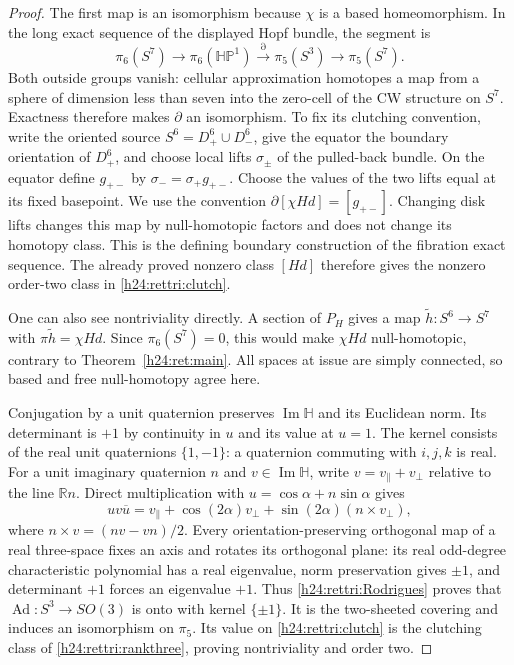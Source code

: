 \begin{proof}
The first map is an isomorphism because $\chi$ is a based
homeomorphism. In the long exact sequence of the displayed Hopf
bundle, the segment is
\[
 \pi_6(S^7)\longrightarrow\pi_6(\mathbb H\mathbb P^1)
 \xrightarrow{\partial}\pi_5(S^3)\longrightarrow\pi_5(S^7).
\]
Both outside groups vanish: cellular approximation homotopes a map
from a sphere of dimension less than seven into the zero-cell of the
CW structure on $S^7$. Exactness therefore makes $\partial$ an
isomorphism. To fix its clutching convention, write the oriented
source $S^6=D^6_+\cup D^6_-$, give the equator the boundary orientation
of $D^6_+$, and choose local lifts $\sigma_\pm$ of the pulled-back
bundle. On the equator define $g_{+-}$ by
$\sigma_- = \sigma_+ g_{+-}$. Choose the values of the two lifts
equal at its fixed basepoint. We use the convention
$\partial[\chi H d]=[g_{+-}]$. Changing disk lifts changes this map
by null-homotopic factors and does not change its homotopy class.
This is the defining boundary construction of the fibration exact
sequence. The already proved nonzero class $[H d]$ therefore gives
the nonzero order-two class in \eqref{h24:rettri:clutch}.

One can also see nontriviality directly. A section of $P_H$ gives a
map $\widetilde h:S^6\to S^7$ with
$\pi\widetilde h=\chi H d$. Since $\pi_6(S^7)=0$, this would make
$\chi H d$ null-homotopic, contrary to Theorem~\ref{h24:ret:main}.
All spaces at issue are simply connected, so based and free
null-homotopy agree here.

Conjugation by a unit quaternion preserves $\operatorname{Im}\mathbb H$
and its Euclidean norm. Its determinant is $+1$ by continuity in
$u$ and its value at $u=1$. The kernel consists of the real unit
quaternions $\{1,-1\}$: a quaternion commuting with $i,j,k$ is real.
For a unit imaginary quaternion $n$ and $v\in\operatorname{Im}\mathbb H$,
write $v=v_\parallel+v_\perp$ relative to the line $\mathbb R n$.
Direct multiplication with $u=\cos\alpha+n\sin\alpha$ gives
\begin{equation}
 u v\overline u=v_\parallel+\cos(2\alpha)v_\perp
                     +\sin(2\alpha)(n\times v_\perp),
 \label{h24:rettri:Rodrigues}
\end{equation}
where $n\times v=(nv-vn)/2$. Every orientation-preserving
orthogonal map of a real three-space fixes an axis and rotates its
orthogonal plane: its real odd-degree characteristic polynomial has
a real eigenvalue, norm preservation gives $\pm1$, and determinant
$+1$ forces an eigenvalue $+1$. Thus
\eqref{h24:rettri:Rodrigues} proves that
$\operatorname{Ad}:S^3\to SO(3)$ is onto with kernel $\{\pm1\}$.
It is the two-sheeted covering and induces an isomorphism on
$\pi_5$. Its value on \eqref{h24:rettri:clutch} is the clutching
class of \eqref{h24:rettri:rankthree}, proving nontriviality and
order two.


\end{proof}

